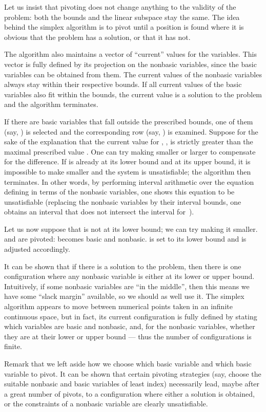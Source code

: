 Let us insist that pivoting does not change anything to the validity of the problem: both the bounds and the linear subspace stay the same. The idea behind the simplex algorithm is to pivot until a position is found where it is obvious that the problem has a solution, or that it has not.

The algorithm also maintains a vector of ``current'' values for the variables. This vector is fully defined by its projection on the nonbasic variables, since the basic variables can be obtained from them. The current values of the nonbasic variables always stay within their respective bounds. If all current values of the basic variables also fit within the bounds, the current value is a solution to the problem and the algorithm terminates.

If there are basic variables that fall outside the prescribed bounds, one of them (say, ) is selected and the corresponding row (say, ) is examined. Suppose for the sake of the explanation that the current value for , , is strictly greater than the maximal prescribed value . One can try making  smaller or  larger to compensate for the difference. If  is already at its lower bound and  at its upper bound, it is impossible to make  smaller and the system is unsatisfiable; the algorithm then terminates. In other words, by performing interval arithmetic over the equation defining  in terms of the nonbasic variables, one shows this equation to be unsatisfiable (replacing the nonbasic variables by their interval bounds, one obtains an interval that does not intersect the interval for~).

Let us now suppose that  is not at its lower bound; we can try making it smaller.  and  are pivoted:  becomes basic and  nonbasic.  is set to its lower bound and  is adjusted accordingly.

It can be shown that if there is a solution to the problem, then there is one configuration where any nonbasic variable is either at its lower or upper bound. Intuitively, if some nonbasic variables are ``in the middle'', then this means we have some ``slack margin'' available, so we should as well use it.
The simplex algorithm appears to move between numerical points taken in an infinite continuous space, but in fact, its current configuration is fully defined by stating which variables are basic and nonbasic, and, for the nonbasic variables, whether they are at their lower or upper bound --- thus the number of configurations is finite.

Remark that we left aside how we choose which basic variable and which basic variable to pivot. It can be shown that certain pivoting strategies (say, choose the suitable nonbasic and basic variables of least index) necessarily lead, maybe after a great number of pivots, to a configuration where either a solution is obtained, or the constraints of a nonbasic variable are clearly unsatisfiable.


